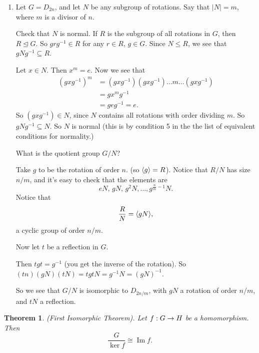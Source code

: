 \documentclass{article}
\newtheorem{theorem}{Theorem}
\theoremstyle{definition} \newtheorem*{definition}{Definition}
\newcommand{\ism}{\cong} \newcommand{\elemt}[2]{#1_{{#2}\sigma(#2)}}
\DeclareMathOperator{\Ima}{Im} \DeclareMathOperator{\Sym}{Sym}
\begin{document}
\begin{exmps}
\begin{enumerate}
     \item Let $G=D_{2n}$, and let $N$ be any subgroup of rotations. Say that
       $|N|=m$, where $m$ is a divisor of $n$.

       Check that $N$ is normal. If $R$ is the subgroup of all rotations in
       $G$, then $R \trianglelefteq G$. So $g r g^{-1} \in R$ for any $r \in
       R$, $g \in G$. Since $N \leq R$, we see that $g N g^{-1} \subseteq R$.

       Let $x \in N$. Then $x^m = e$. Now we see that \begin{align*} \left(
         gxg^{-1} \right)^m &= (gxg^{-1})(gxg^{-1})\dots m \dots(gxg^{-1})\\ &=
         gx^mg^{-1}\\ &= geg^{-1} = e.  \end{align*} So $(gxg^{-1})\in N$,
       since $N$ contains all rotations with order dividing $m$. So
       $gNg^{-1}\subseteq N$. So $N$ is normal (this is by condition 5 in the
       the list of equivalent conditions for normality.)

       What is the quotient group $G/N$?

       Take $g$ to be the rotation of order $n$. (so $\langle g \rangle=R$). Notice that
       $R/N$ has size $n/m$, and it's easy to check that the elements are \[
       eN,\,gN,\,g^{2}N,\dots,g^{\frac{n}{m} - 1}N.  \] Notice that \[
       \frac{R}{N}=\langle gN \rangle, \] a cyclic group of order $n/m$. 

       Now let $t$ be a reflection in $G$.

       Then $tgt=g^{-1}$ (you get the inverse of the rotation). So
       $(tn)(gN)(tN)=tgtN=g^{-1}N=(gN)^{-1}$.

       So we see that $G/N$ is isomorphic to $D_{2n/m}$, with $gN$ a rotation
       of order $n/m$, and $tN$ a reflection.  \end{enumerate} \end{exmps}

  \begin{theorem} (First Isomorphic Theorem). Let $f : G \rightarrow H$ be a
    homomorphism. Then \[ \frac{G}{\ker f} \ism \Ima f.  \]
    \label{thm:firstisomorphic} \end{theorem}
\end{document}
